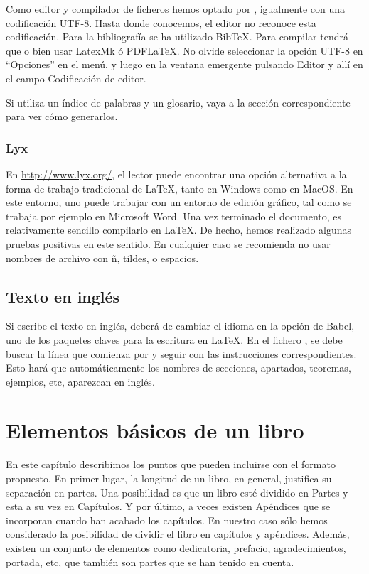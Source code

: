 Como editor y compilador de ficheros hemos optado por \tsp{\textregistered}, igualmente con una codificación UTF-8. Hasta donde conocemos, el editor \tsp{\textregistered} no reconoce esta codificación. Para la bibliografía se ha utilizado BibTeX. Para compilar tendrá que o bien usar LatexMk ó PDFLaTeX. No olvide seleccionar la opción UTF-8 en ``Opciones'' en el menú, y luego en la ventana emergente pulsando Editor y allí en el campo Codificación de editor. 

Si utiliza un índice de palabras y un glosario, vaya a la sección correspondiente para ver cómo generarlos.

\subsubsection{Lyx}

En \url{http://www.lyx.org/}, el lector puede encontrar una opción alternativa a la forma de trabajo tradicional de \LaTeX, tanto en Windows\tsp{\textregistered} como en MacOS\tsp{\textregistered}. En este entorno, uno puede trabajar con un entorno de edición gráfico, tal como se trabaja por ejemplo en Microsoft Word\tsp{\textregistered}. Una vez terminado el documento, es relativamente sencillo compilarlo en \LaTeX. De hecho, hemos realizado algunas pruebas positivas en este sentido. En cualquier caso se recomienda no usar nombres de archivo con ñ, tildes, o espacios. 

\subsection{Texto en inglés}
Si escribe el texto en inglés, deberá de cambiar el idioma en la opción de Babel, uno de los paquetes claves para la escritura en \LaTeX. En el fichero , se debe buscar la línea que comienza por  y seguir con las instrucciones correspondientes. Esto hará que automáticamente los nombres de secciones, apartados, teoremas, ejemplos, etc, aparezcan en inglés. 

\section{Elementos básicos de un libro}
%
En este capítulo describimos los puntos que pueden incluirse con el formato propuesto. En primer lugar, la longitud de un libro, en general, justifica su separación en partes. Una posibilidad es que un libro esté dividido en Partes y esta a su vez en Capítulos. Y por último, a veces existen Apéndices que se incorporan cuando han acabado los capítulos. En nuestro caso sólo hemos considerado la posibilidad de dividir el libro en capítulos y apéndices. Además, existen un conjunto de elementos como dedicatoria, prefacio, agradecimientos, portada, etc, que también son partes que se han tenido en cuenta. 


